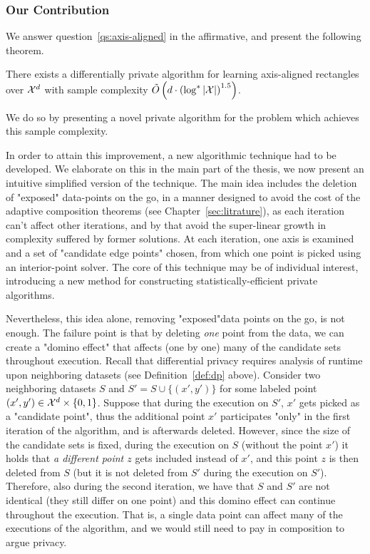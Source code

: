 \documentclass[12pt,a4paper,oneside,onecolumn]{book}
\begin{document}
%
%

%
%

\subsubsection{Our Contribution}

We answer question~\ref{qs:axis-aligned} in the affirmative, and present the following theorem.

\begin{theorem}[informal]
\label{thm:informal}
There exists a differentially private algorithm for learning axis-aligned rectangles over $\mathcal{X}^d$ with sample complexity $\tilde{O}\left( d\cdot \left( \log^*|\mathcal{X}| \right)^{1.5} \right)$.
\end{theorem}

We do so by presenting a novel private algorithm for the problem 
which achieves this sample complexity.

In order to attain this improvement, 
a new algorithmic technique had to be developed.
We elaborate on this in the main part of the thesis, we now present an intuitive simplified version of the technique.
The main idea includes the deletion of "exposed" data-points on the go, in a manner designed to avoid the cost of the adaptive composition theorems (see Chapter~\ref{sec:litrature}), as each iteration can't affect other iterations, and by that avoid the super-linear growth in complexity suffered by former solutions.
At each iteration, one axis is examined and a set of "candidate edge points" chosen,
from which one point is picked using an interior-point solver.
The core of this technique may be of individual interest, introducing a new method for constructing statistically-efficient private algorithms.

Nevertheless, this idea alone, removing "exposed"data points on the go, 
is not enough.
The failure point is that by deleting {\em one} point from the data, we can create a "domino effect" that affects (one by one) many of the candidate sets throughout execution. 
Recall that differential privacy requires analysis of runtime upon neighboring datasets (see Definition~\ref{def:dp} above).
Consider two neighboring datasets $S$ and $S'=S\cup\{(x',y')\}$ for some labeled point $(x',y')\in \mathcal{X}^d\times\{0,1\}$. Suppose that during the execution on $S'$, $x'$ gets picked as a "candidate point", thus the additional point $x'$ participates "only" in the first iteration of the algorithm, and is afterwards deleted. 
However, since the size of the candidate sets is fixed, during the execution on $S$ (without the point $x'$) it holds that {\em a different point $z$} gets included instead of $x'$, and this point $z$ is then deleted from $S$ (but it is not deleted from $S'$ during the execution on $S'$). 
Therefore, also during the second iteration, we have that $S$ and $S'$ are not identical (they still differ on one point) and this domino effect can continue throughout the execution. 
That is, a single data point can affect many of the executions of the algorithm, and we would still need to pay in composition to argue privacy.
\end{document}
